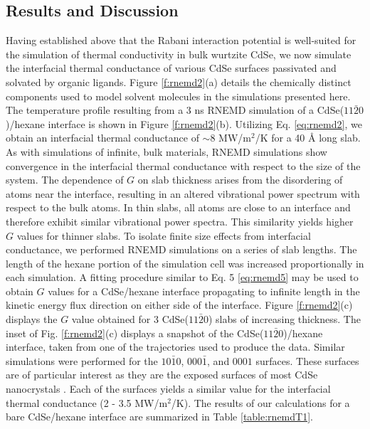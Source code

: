 \subsection{Results and Discussion}
Having established above that the Rabani interaction potential is well-suited for the simulation of thermal conductivity in bulk wurtzite CdSe, we now simulate the interfacial thermal conductance of various CdSe surfaces passivated and solvated by organic ligands.  Figure \ref{f:rnemd2}(a) details the chemically distinct components used to model solvent molecules in the simulations presented here.  The temperature profile resulting from a 3 ns RNEMD simulation of a CdSe($11\bar{2}0$)/hexane interface is shown in Figure \ref{f:rnemd2}(b).  Utilizing Eq. \ref{eq:rnemd2}, we obtain an interfacial thermal conductance of $\sim$8 MW/m$^2$/K for a 40 \r{A} long slab.  As with simulations of infinite, bulk materials, RNEMD simulations show convergence in the interfacial thermal conductance with respect to the size of the system. The dependence of $G$ on slab thickness arises from the disordering of atoms near the interface, resulting in an altered vibrational power spectrum with respect to the bulk atoms. In thin slabs, all atoms are close to an interface and therefore exhibit similar vibrational power spectra. This similarity yields higher $G$ values for thinner slabs. To isolate finite size effects from interfacial conductance, we performed RNEMD simulations on a series of slab lengths. The length of the hexane portion of the simulation cell was increased proportionally in each simulation. A fitting procedure similar to Eq. 5 \ref{eq:rnemd5} may be used to obtain $G$  values for a CdSe/hexane interface propagating to infinite length in the kinetic energy flux direction on either side of the interface.  Figure \ref{f:rnemd2}(c) displays the $G$ value obtained for 3 CdSe($11\bar{2}0$) slabs of increasing thickness.  The inset of Fig. \ref{f:rnemd2}(c) displays a snapshot of the CdSe($11\bar{2}0$)/hexane interface, taken from one of the trajectories used to produce the data.  Similar simulations were performed for the $10\bar{1}0$, $000\bar{1}$, and $0001$ surfaces.  These surfaces are of particular interest as they are the exposed surfaces of most CdSe nanocrystals \cite{doi:10.1021/nl0485861}.  Each of the surfaces yields a similar value for the interfacial thermal conductance (2 - 3.5 MW/m$^2$/K).  The results of our calculations for a bare CdSe/hexane interface are summarized in Table \ref{table:rnemdT1}. \par

